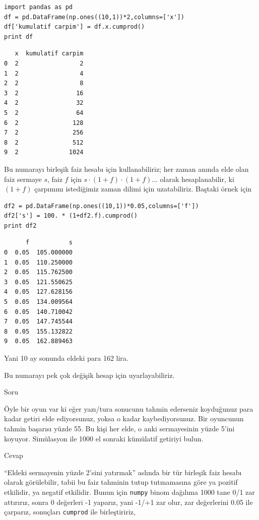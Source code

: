 \documentclass[12pt,fleqn]{article}\usepackage{../../common}
\begin{document}
\begin{verbatim}
import pandas as pd
df = pd.DataFrame(np.ones((10,1))*2,columns=['x'])
df['kumulatif carpim'] = df.x.cumprod()
print df
\end{verbatim}

\begin{verbatim}
   x  kumulatif carpim
0  2                 2
1  2                 4
2  2                 8
3  2                16
4  2                32
5  2                64
6  2               128
7  2               256
8  2               512
9  2              1024
\end{verbatim}

Bu numarayı birleşik faiz hesabı için kullanabiliriz; her zaman anında elde
olan faiz sermaye $s$, faiz $f$ için $s \cdot (1+f) \cdot (1+f) ... $
olarak hesaplanabilir, ki $(1+f)$ çarpımını istediğimiz zaman dilimi için
uzatabiliriz. Baştaki örnek için 

\begin{verbatim}
df2 = pd.DataFrame(np.ones((10,1))*0.05,columns=['f'])
df2['s'] = 100. * (1+df2.f).cumprod()
print df2
\end{verbatim}

\begin{verbatim}
      f           s
0  0.05  105.000000
1  0.05  110.250000
2  0.05  115.762500
3  0.05  121.550625
4  0.05  127.628156
5  0.05  134.009564
6  0.05  140.710042
7  0.05  147.745544
8  0.05  155.132822
9  0.05  162.889463
\end{verbatim}

Yani 10 ay sonunda eldeki para 162 lira. 

Bu numarayı pek çok değişik hesap için uyarlayabiliriz. 

Soru

Öyle bir oyun var ki eğer yazı/tura sonucunu tahmin ederseniz koyduğunuz
para kadar getiri elde ediyorsunuz, yoksa o kadar kaybediyorsunuz. Bir
oyuncunun tahmin başarısı yüzde 55. Bu kişi her elde, o anki sermayesinin
yüzde 5'ini koyuyor. Simülasyon ile 1000 el sonraki kümülatif getiriyi
bulun.

Cevap

``Eldeki sermayenin yüzde 2'sini yatırmak'' aslında bir tür birleşik faiz
hesabı olarak görülebilir, tabii bu faiz tahminin tutup tutmamasına göre ya
pozitif etkilidir, ya negatif etkilidir. Bunun için \verb!numpy!  binom
dağılıma 1000 tane 0/1 zar attırırız, sonra 0 değerleri -1 yaparız, yani
-1/+1 zar olur, zar değerlerini 0.05 ile çarparız, sonuçları \verb!cumprod!
ile birleştiririz,
\end{document}
